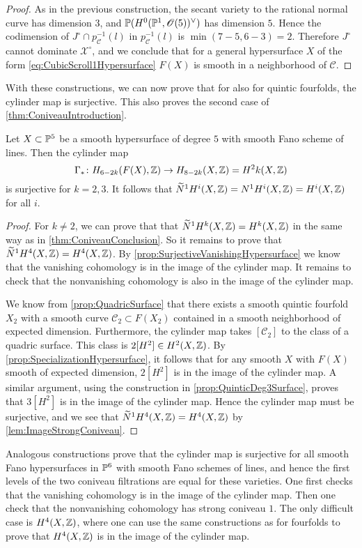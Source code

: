 \begin{proof}
As in the previous construction, the secant variety to the rational normal curve has dimension $3$, and $\P(H^0(\P^1,\sO(5))^\vee)$ has dimension $5$. Hence the codimension of $J^\circ \cap p_{\mathcal{C}}^{-1}(l)$ in $p_{\mathcal{C}}^{-1}(l)$ is $\min(7-5,6-3) = 2$. Therefore $J^\circ$ cannot dominate $\mathscr{X}^\circ$, and we conclude that for a general hypersurface $X$ of the form \eqref{eq:CubicScroll1Hypersurface} $F(X)$ is smooth in a neighborhood of $\mathcal{C}$.
\end{proof}


With these constructions, we can now prove that for also for quintic fourfolds, the cylinder map is surjective. This also proves the second case of \cref{thm:ConiveauIntroduction}.
\begin{theorem}
  Let $X \subset \P^5$ be a smooth hypersurface of degree $5$ with smooth Fano scheme of lines. Then the cylinder map
  \[\Gamma_* \from H_{6-2k}(F(X), \Z) \to H_{8-2k}(X, \Z) = H^2k(X, \Z)\]
  is surjective for $k=2,3$. It follows that
   $\widetilde{N}^1H^i(X,\Z) =  N^1H^i(X,\Z) = H^i(X,\Z)$ for all $i$.
\end{theorem}
\begin{proof}
	For $k \neq 2$, we can prove that that $\widetilde{N}^1H^k(X,\Z) = H^k(X,\Z)$ in the same way as in \cref{thm:ConiveauConclusion}. So it remains to prove that $\widetilde{N}^1H^4(X,\Z) = H^4(X,\Z)$. By \cref{prop:SurjectiveVanishingHypersurface} we know that the vanishing cohomology is in the image of the cylinder map. It remains to check that the nonvanishing cohomology is also in the image of the cylinder map.
	
	We know from \cref{prop:QuadricSurface} that there exists a smooth quintic fourfold $X_2$ with a smooth curve $\mathcal{C}_2 \subset F(X_2)$ contained in a smooth neighborhood of expected dimension. Furthermore, the cylinder map takes $[\mathcal{C}_2]$ to the class of a quadric surface. This class is $2[H^2] \in H^2(X,\Z)$. By \cref{prop:SpecializationHypersurface}, it follows that for any smooth $X$ with $F(X)$ smooth of expected dimension, $2[H^2]$ is in the image of the cylinder map. A similar argument, using the construction in \cref{prop:QuinticDeg3Surface}, proves that $3[H^2]$ is in the image of the cylinder map. Hence the cylinder map must be surjective, and we see that $\widetilde{N}^1H^4(X,\Z) = H^4(X,\Z)$ by \cref{lem:ImageStrongConiveau}. 
\end{proof}

\begin{remark}
	Analogous constructions prove that the cylinder map is surjective for all smooth Fano hypersurfaces in $\P^6$ with smooth Fano schemes of lines, and hence the first levels of the two coniveau filtrations are equal for these varieties. One first checks that the vanishing cohomology is in the image of the cylinder map. Then one check that the nonvanishing cohomology has strong coniveau $1$. The only difficult case is $H^4(X,\Z)$, where one can use the same constructions as for fourfolds to prove that $H^4(X,\Z)$ is in the image of the cylinder map.
\end{remark}

\printbibliography[heading = subbibliography]
\stopcontents[chapters]